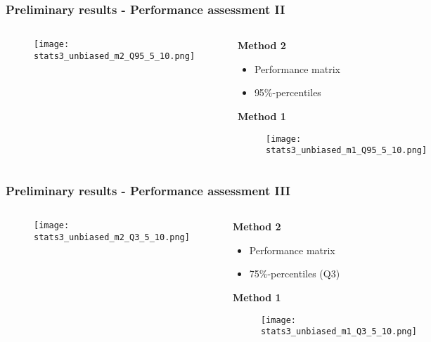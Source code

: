 \documentclass[11pt,aspectratio=169]{beamer}
\begin{document}
	\begin{frame}
		\frametitle{Preliminary results - Performance assessment II}
		\begin{columns}[t]
			\begin{RIPcolleft}
				\begin{figure}
					\texttt{[image: stats3\_unbiased\_m2\_Q95\_5\_10.png]}
				\end{figure}
			\end{RIPcolleft}
			\begin{RIPcolright}
				\textbf{Method 2}\\
				\begin{itemize}
					\item Performance matrix
					\item 95\%-percentiles
				\end{itemize}
				\vspace{.5em}
				\textbf{Method 1}\\
				\begin{figure}
					\texttt{[image: stats3\_unbiased\_m1\_Q95\_5\_10.png]}
				\end{figure}
			\end{RIPcolright}
		\end{columns}
	\end{frame}
	\begin{frame}
		\frametitle{Preliminary results - Performance assessment III}
		\begin{columns}[t]
			\begin{RIPcolleft}
				\begin{figure}
					\texttt{[image: stats3\_unbiased\_m2\_Q3\_5\_10.png]}
				\end{figure}
			\end{RIPcolleft}
			\begin{RIPcolright}
				\textbf{Method 2}\\
				\begin{itemize}
					\item Performance matrix
					\item 75\%-percentiles (Q3)
				\end{itemize}
				\vspace{.5em}
				\textbf{Method 1}\\
				\begin{figure}
					\texttt{[image: stats3\_unbiased\_m1\_Q3\_5\_10.png]}
				\end{figure}
			\end{RIPcolright}
		\end{columns}
	\end{frame}
\end{document}
